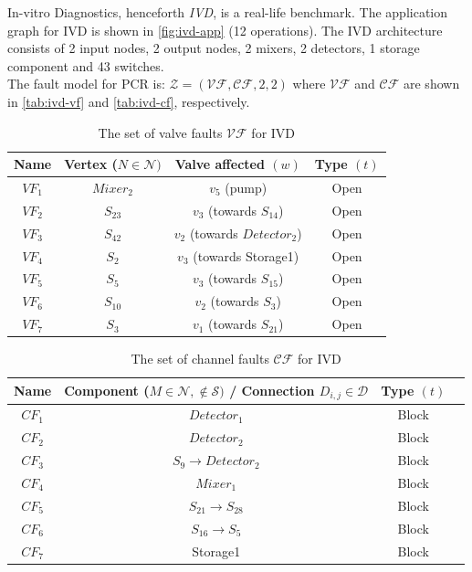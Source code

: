 In-vitro Diagnostics, henceforth \emph{IVD}, is a real-life benchmark. The application graph for IVD is shown in \autoref{fig:ivd-app} (12 operations). The IVD architecture consists of 2 input nodes, 2 output nodes, 2 mixers, 2 detectors, 1 storage component and 43 switches.\\
The fault model for PCR is: $\mathcal{Z} = (\mathcal{VF}, \mathcal{CF}, 2, 2)$ where $\mathcal{VF}$ and $\mathcal{CF}$ are shown in \autoref{tab:ivd-vf} and \autoref{tab:ivd-cf}, respectively.

\begin{table}[H]
\centering
\caption{The set of valve faults $\mathcal{VF}$ for IVD}
\begin{tabular}{| c | c | c | c |}
\hline
\textbf{Name} & \textbf{Vertex} ($N \in \mathcal{N})$ & \textbf{Valve affected} $(w)$ & \textbf{Type} $(t)$ \\ \hline
$VF_1$ & $Mixer_2$ & $v_5$ (pump) & Open \\ \hline
$VF_2$ & $S_{23}$ & $v_3$ (towards $S_{14}$) & Open \\ \hline
$VF_3$ & $S_{42}$ & $v_2$ (towards $Detector_2$) & Open \\ \hline
$VF_4$ & $S_2$ & $v_3$ (towards Storage1) & Open \\ \hline
$VF_5$ & $S_5$ & $v_3$ (towards $S_{15}$) & Open \\ \hline
$VF_6$ & $S_{10}$ & $v_2$ (towards $S_3$) & Open \\ \hline
$VF_7$ & $S_3$ & $v_1$ (towards $S_{21}$) & Open \\ \hline
\end{tabular}
\label{tab:ivd-vf}
\end{table}

\begin{table}[H]
\centering
\caption{The set of channel faults $\mathcal{CF}$ for IVD}
\begin{tabular}{| c | c | c | c |}
\hline
\textbf{Name} & \textbf{Component} ($M \in \mathcal{N}, \notin \mathcal{S})$ \textbf{/ Connection} $D_{i, j} \in \mathcal{D}$ & \textbf{Type} $(t)$ \\ \hline
$CF_1$ & $Detector_1$ & Block \\ \hline
$CF_2$ & $Detector_2$ & Block \\ \hline
$CF_3$ & $S_9 \rightarrow Detector_2$ & Block \\ \hline
$CF_4$ & $Mixer_1$ & Block \\ \hline
$CF_5$ & $S_{21} \rightarrow S_{28}$ & Block \\ \hline
$CF_6$ & $S_{16} \rightarrow S_5$ & Block \\ \hline
$CF_7$ & Storage1 & Block \\ \hline
\end{tabular}
\label{tab:ivd-cf}
\end{table}


